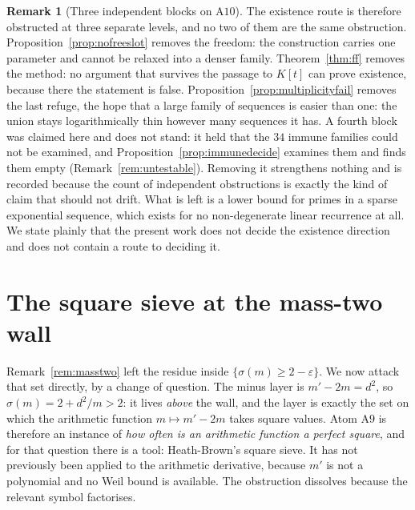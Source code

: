 \documentclass[11pt]{article}
\theoremstyle{definition}
\newtheorem{remark}[theorem]{Remark}
\begin{document}
\begin{remark}[Three independent blocks on $\mathrm{A}10$]\label{rem:threeblocks}
The existence route is therefore obstructed at three separate levels, and no two of them are the
same obstruction. Proposition~\ref{prop:nofreeslot} removes the freedom: the construction carries
one parameter and cannot be relaxed into a denser family. Theorem~\ref{thm:ff} removes the
method: no argument that survives the passage to $K[t]$ can prove existence, because there the
statement is false. Proposition~\ref{prop:multiplicityfail} removes the last refuge, the hope that a
large family of sequences is easier than one: the union stays logarithmically thin however many
sequences it has. A fourth block was claimed here and does not stand: it held that the $34$ immune
families could not be examined, and Proposition~\ref{prop:immunedecide} examines them and finds them
empty (Remark~\ref{rem:untestable}). Removing it strengthens nothing and is recorded because the
count of independent obstructions is exactly the kind of claim that should not drift.
What is left is a lower bound for primes in a sparse exponential sequence, which exists for no
non-degenerate linear recurrence at all. We state plainly that the present work does not decide the
existence direction and does not contain a route to deciding it.
\end{remark}

\section{The square sieve at the mass-two wall}\label{sec:sqsieve}

Remark~\ref{rem:masstwo} left the residue inside $\{\sigma(m)\ge2-\varepsilon\}$. We now attack that
set directly, by a change of question. The minus layer is $m'-2m=d^2$, so $\sigma(m)=2+d^2/m>2$:
it lives \emph{above} the wall, and the layer is exactly the set on which the arithmetic function
$m\mapsto m'-2m$ takes square values. Atom $\mathrm{A}9$ is therefore an instance of
\emph{how often is an arithmetic function a perfect square}, and for that question there is a tool:
Heath-Brown's square sieve. It has not previously been applied to the arithmetic derivative,
because $m'$ is not a polynomial and no Weil bound is available. The obstruction dissolves because
the relevant symbol factorises.
\end{document}
